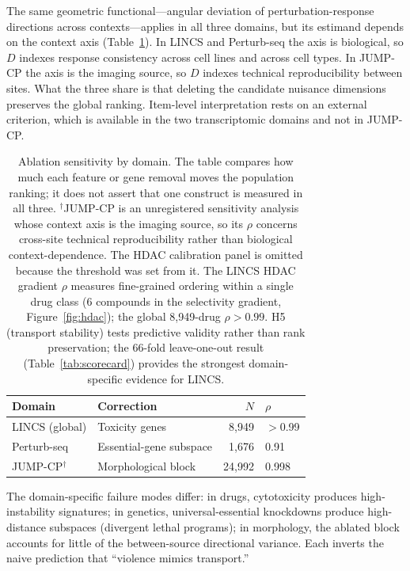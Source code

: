 \documentclass[11pt]{article}
\begin{document}
The same geometric functional---angular deviation of perturbation-response
directions across contexts---applies in all three domains, but its estimand
depends on the context axis (Table~\ref{tab:cross_domain}). In LINCS and
Perturb-seq the axis is biological, so $D$ indexes response consistency
across cell lines and across cell types. In JUMP-CP the axis is the imaging
source, so $D$ indexes technical reproducibility between sites. What the three
share is that deleting the candidate nuisance dimensions preserves the
global ranking. Item-level interpretation rests on an external criterion,
which is available in the two transcriptomic domains and not in JUMP-CP.

\begin{table}[t]
\centering
\caption{Ablation sensitivity by domain. The table compares how much each
feature or gene removal moves the population ranking; it does not assert that
one construct is measured in all three. $^{\dagger}$JUMP-CP is an unregistered
sensitivity analysis whose context axis is the imaging source, so its $\rho$
concerns cross-site technical reproducibility rather than biological
context-dependence. The HDAC calibration panel is omitted
because the threshold was set from it. The LINCS HDAC gradient $\rho$
measures fine-grained ordering within a single drug class (6 compounds
in the selectivity gradient, Figure~\ref{fig:hdac});
the global 8{,}949-drug $\rho > 0.99$. H5 (transport stability) tests
predictive validity rather than rank preservation; the 66-fold
leave-one-out result (Table~\ref{tab:scorecard}) provides the strongest
domain-specific evidence for LINCS.}
\label{tab:cross_domain}
\small
\begin{tabular}{llrl}
\toprule
Domain & Correction & $N$ & $\rho$ \\
\midrule
LINCS (global) & Toxicity genes & 8{,}949 & $>$0.99 \\
Perturb-seq & Essential-gene subspace & 1{,}676 & 0.91 \\
JUMP-CP$^{\dagger}$ & Morphological block & 24{,}992 & 0.998 \\
\bottomrule
\end{tabular}
\end{table}

The domain-specific failure modes differ: in drugs, cytotoxicity
produces high-instability signatures; in genetics, universal-essential
knockdowns produce high-distance subspaces (divergent lethal programs);
in morphology, the ablated block accounts for little of the
between-source directional variance. Each inverts the naive prediction that
``violence mimics transport.''
\end{document}
